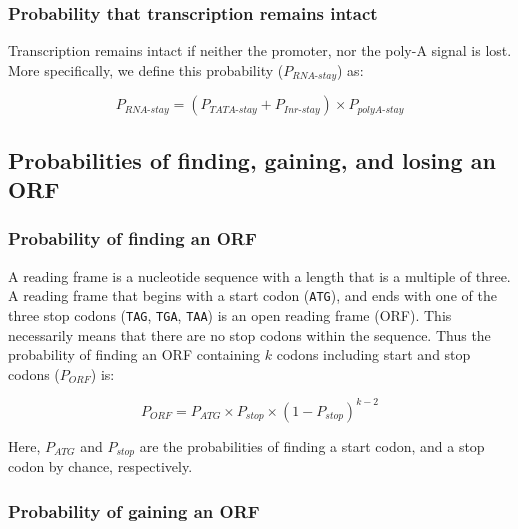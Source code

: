 \documentclass[12pt,a4paper]{article}
\begin{document}
\subsubsection{Probability that transcription remains intact}

Transcription remains intact if neither the promoter, nor the poly-A signal is lost. More specifically, we define this probability ($P_\textit{RNA-stay}$) as:

\begin{equation}
P_\textit{RNA-stay} = (P_\textit{TATA-stay} + P_\textit{Inr-stay}) \times P_\textit{polyA-stay}
\label{eqrnastay}
\end{equation}

\subsection{Probabilities of finding, gaining, and losing an ORF}

\label{methORF}

\subsubsection{Probability of finding an ORF}

A reading frame is a nucleotide sequence with a length that is a multiple of three. A reading frame that begins with a start codon (\texttt{ATG}), and ends with one of the three stop codons (\texttt{TAG}, \texttt{TGA}, \texttt{TAA}) is an open reading frame (ORF). This necessarily means that there are no stop codons within the sequence. Thus the probability of finding an ORF containing $k$ codons including start and stop codons ($P_\textit{ORF}$) is: 

\begin{equation}
P_\textit{ORF} = P_\textit{ATG} \times P_\textit{stop} \times (1 - P_\textit{stop})^{k-2}
\label{eqorfprob}
\end{equation}

Here, $P_\textit{ATG}$ and $P_\textit{stop}$ are the probabilities of finding a start codon, and a stop codon by chance, respectively.

\subsubsection{Probability of gaining an ORF}
\end{document}
